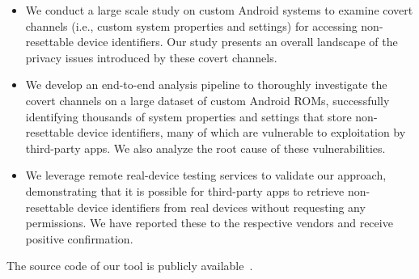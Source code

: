 \begin{itemize}
    \item We conduct a large scale study on custom Android systems to examine covert channels (i.e., custom system properties and settings) for accessing non-resettable device identifiers. 
    Our study presents an overall landscape of the privacy issues introduced by these covert channels.

    \item We develop an end-to-end analysis pipeline to thoroughly investigate the covert channels on a large dataset of custom Android ROMs, successfully identifying thousands of system properties and settings that store non-resettable device identifiers, many of which are vulnerable to exploitation by third-party apps. We also analyze the root cause of these vulnerabilities.

    \item We leverage remote real-device testing services to validate our approach, demonstrating that it is possible for third-party apps to retrieve non-resettable device identifiers from real devices without requesting any permissions. We have reported these to the respective vendors and receive positive confirmation.
    
\end{itemize}

The source code of our tool is publicly available~\cite{opensource}.